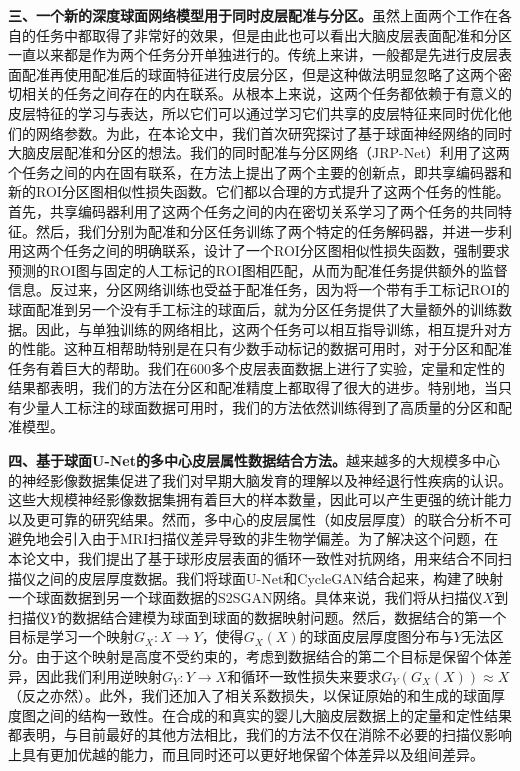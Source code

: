 \textbf{三、一个新的深度球面网络模型用于同时皮层配准与分区。}虽然上面两个工作在各自的任务中都取得了非常好的效果，但是由此也可以看出大脑皮层表面配准和分区一直以来都是作为两个任务分开单独进行的。传统上来讲，一般都是先进行皮层表面配准再使用配准后的球面特征进行皮层分区，但是这种做法明显忽略了这两个密切相关的任务之间存在的内在联系。从根本上来说，这两个任务都依赖于有意义的皮层特征的学习与表达，所以它们可以通过学习它们共享的皮层特征来同时优化他们的网络参数。为此，在本论文中，我们首次研究探讨了基于球面神经网络的同时大脑皮层配准和分区的想法。我们的同时配准与分区网络（JRP-Net）利用了这两个任务之间的内在固有联系，在方法上提出了两个主要的创新点，即共享编码器和新的ROI分区图相似性损失函数。它们都以合理的方式提升了这两个任务的性能。首先，共享编码器利用了这两个任务之间的内在密切关系学习了两个任务的共同特征。然后，我们分别为配准和分区任务训练了两个特定的任务解码器，并进一步利用这两个任务之间的明确联系，设计了一个ROI分区图相似性损失函数，强制要求预测的ROI图与固定的人工标记的ROI图相匹配，从而为配准任务提供额外的监督信息。反过来，分区网络训练也受益于配准任务，因为将一个带有手工标记ROI的球面配准到另一个没有手工标注的球面后，就为分区任务提供了大量额外的训练数据。因此，与单独训练的网络相比，这两个任务可以相互指导训练，相互提升对方的性能。这种互相帮助特别是在只有少数手动标记的数据可用时，对于分区和配准任务有着巨大的帮助。我们在600多个皮层表面数据上进行了实验，定量和定性的结果都表明，我们的方法在分区和配准精度上都取得了很大的进步。特别地，当只有少量人工标注的球面数据可用时，我们的方法依然训练得到了高质量的分区和配准模型。

\textbf{四、基于球面U-Net的多中心皮层属性数据结合方法。}越来越多的大规模多中心的神经影像数据集促进了我们对早期大脑发育的理解以及神经退行性疾病的认识。这些大规模神经影像数据集拥有着巨大的样本数量，因此可以产生更强的统计能力以及更可靠的研究结果。然而，多中心的皮层属性（如皮层厚度）的联合分析不可避免地会引入由于MRI扫描仪差异导致的非生物学偏差。为了解决这个问题，在本论文中，我们提出了基于球形皮层表面的循环一致性对抗网络，用来结合不同扫描仪之间的皮层厚度数据。我们将球面U-Net和CycleGAN结合起来，构建了映射一个球面数据到另一个球面数据的S2SGAN网络。具体来说，我们将从扫描仪$X$到扫描仪$Y$的数据结合建模为球面到球面的数据映射问题。然后，数据结合的第一个目标是学习一个映射$G_X:X\rightarrow Y$，使得$G_X(X)$的球面皮层厚度图分布与$Y$无法区分。由于这个映射是高度不受约束的，考虑到数据结合的第二个目标是保留个体差异，因此我们利用逆映射$G_Y:Y\rightarrow X$和循环一致性损失来要求$G_Y(G_X(X))\approx X$（反之亦然）。此外，我们还加入了相关系数损失，以保证原始的和生成的球面厚度图之间的结构一致性。在合成的和真实的婴儿大脑皮层数据上的定量和定性结果都表明，与目前最好的其他方法相比，我们的方法不仅在消除不必要的扫描仪影响上具有更加优越的能力，而且同时还可以更好地保留个体差异以及组间差异。


